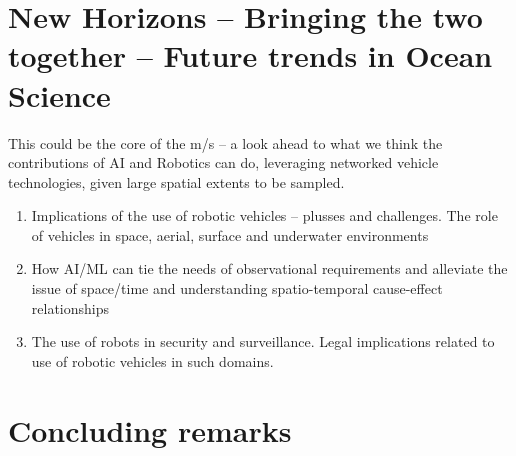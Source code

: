 \documentclass[12pt]{article}
\begin{document}
\section{New Horizons -- Bringing the two together -- Future trends in Ocean Science}

This could be the core of the m/s -- a look ahead to what we think the
contributions of AI and Robotics can do, leveraging networked vehicle
technologies, given large spatial extents to be sampled. 

\begin{enumerate} 

\item Implications of the use of robotic vehicles -- plusses and
  challenges. The role of vehicles in space, aerial, surface and
  underwater environments

\item How AI/ML can tie the needs of observational requirements and
  alleviate the issue of space/time and understanding spatio-temporal
  cause-effect relationships

\item The use of robots in security and surveillance. Legal implications
  related to use of robotic vehicles in such domains. 

\end{enumerate}


\section{Concluding remarks}




\footnotesize{
  
}
\end{document}
